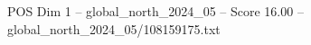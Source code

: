 \begin{textsample}{POS Dim 1 – global\_north\_2024\_05 – Score 16.00 – global\_north\_2024\_05/108159175.txt}
\end{textsample}
